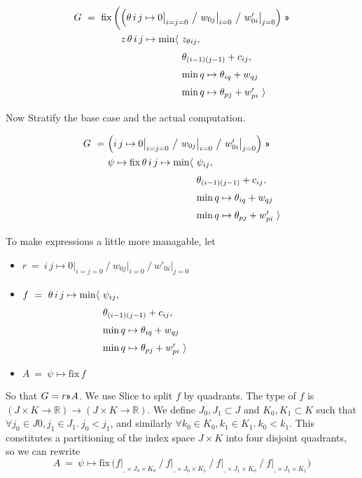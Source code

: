 \documentclass{article}
\newcommand\R{\mathbb{R}}
\begin{document}
\[
\renewcommand\arraystretch{1.5}
\begin{array}{l@{}l@{~}l}
G ~=~ \mathrm{fix}\,\bigg(
      & \lspan2{\Big( \theta\,i\,j \mapsto 0\big|_{i=j=0} ~\big/~ w_{0j}\big|_{i=0} ~\big/~ w'_{0i}\big|_{j=0} \Big) ~\applt } \\
      & z\, \theta\,i\,j \mapsto \min\langle 
                 & z_{\theta ij}, \\
      &          & \theta_{(i-1)(j-1)} + c_{ij}, \\
      &          & \min q\mapsto \theta_{iq} + w_{qj} \\
      &          & \min q\mapsto \theta_{pj} + w'_{pi}~\rangle
\end{array}
\]

\medskip
Now Stratify the base case and the actual computation.

\[
\renewcommand\arraystretch{1.5}
\begin{array}{l@{}l@{~}l}
G ~=~ & \lspan2{\Big( i\,j \mapsto 0\big|_{i=j=0} ~\big/~ w_{0j}\big|_{i=0} ~\big/~ w'_{0i}\big|_{j=0} \Big) ~\applt } \\
      & \psi\mapsto \mathrm{fix}\, \theta\,i\,j \mapsto \min\langle 
                 & \psi_{ij}, \\
      &          & \theta_{(i-1)(j-1)} + c_{ij}, \\
      &          & \min q\mapsto \theta_{iq} + w_{qj} \\
      &          & \min q\mapsto \theta_{pj} + w'_{pi}~\rangle
\end{array}
\]

To make expressions a little more managable, let
\begin{itemize}
  \item $r ~=~ i\,j\mapsto 0\big|_{i=j=0} ~\big/~ w_{0j}\big|_{i=0} ~\big/~ w'_{0i}\big|_{j=0}$
  \item $\begin{array}[t]{@{}l@{~}l}
    f ~=~ \theta\,i\,j \mapsto \min\langle & \psi_{ij}, \\
                & \theta_{(i-1)(j-1)} + c_{ij}, \\
                & \min q\mapsto \theta_{iq} + w_{qj} \\
                & \min q\mapsto \theta_{pj} + w'_{pi}~\rangle
  \end{array}$
  \item $A ~=~ \psi\mapsto \mathrm{fix}\,f$
\end{itemize}

So that $G = r\applt A$. We use Slice to split $f$ by quadrants.
The type of $f$ is $(J\times K\to\R)\to(J\times K\to\R)$. We define $J_0,J_1\subset J$
and $K_0,K_1\subset K$ such that $\forall j_0\in J0,j_1\in J_1.~j_0<j_1$, and
similarly $\forall k_0\in K_0,k_1\in K_1.~k_0<k_1$. This constitutes a partitioning
of the index space $J\times K$ into four disjoint quadrants, so we can rewrite
%
\[A ~=~ \psi\mapsto
        \mathrm{fix}\,\Big( f\big|_{\_\times J_0\times K_0} ~\big/~ 
							f\big|_{\_\times J_0\times K_1} ~\big/~
							f\big|_{\_\times J_1\times K_0} ~\big/~
							f\big|_{\_\times J_1\times K_1}
  \Big)\]
  
\end{document}

